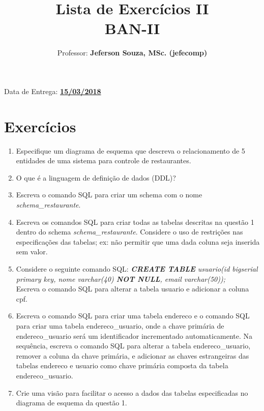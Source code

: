 \documentclass[12pt]{article}
\title{Lista de Exercícios II\\
BAN-II}
\author{Professor: \textbf{Jeferson Souza, MSc. (jefecomp)}}
\begin{document}
\date{}

\maketitle

\begin{center}
Data de Entrega: \textbf{\underline{15/03/2018}}
\end{center}

\section*{Exercícios}

\begin{enumerate}
\itemsep 10mm

\item Especifique um diagrama de esquema que descreva o relacionamento de 5 entidades de uma sistema para controle de restaurantes.

\item O que é a linguagem de definição de dados (DDL)?

\item Escreva o comando SQL para criar um schema com o nome \textit{schema\_restaurante}.

\item Escreva os comandos SQL para criar todas as tabelas descritas na questão 1 dentro do schema \textit{schema\_restaurante}. Considere o uso de restrições nas especificações das tabelas; ex: não permitir que uma dada coluna seja inserida sem valor.

\item Considere o seguinte comando SQL: \textit{\textbf{CREATE TABLE} usuario(id bigserial primary key, nome varchar(40) \textbf{NOT NULL}, email varchar(50));}\\[-1mm]

Escreva o comando SQL para alterar a tabela usuario e adicionar a coluna cpf.

\item Escreva o comando SQL para criar uma tabela endereco e o comando SQL para criar uma tabela endereco\_usuario, onde a chave primária de endereco\_usuario será um identificador incrementado automaticamente. Na sequência, escreva o comando SQL para alterar a tabela endereco\_usuario, remover a coluna da chave primária, e adicionar as chaves estrangeiras das tabelas endereco e usuario como chave primária composta da tabela endereco\_usuario.

\item Crie uma visão para facilitar o acesso a dados das tabelas especificadas no diagrama de esquema da questão 1. 
\end{enumerate}
\end{document}
